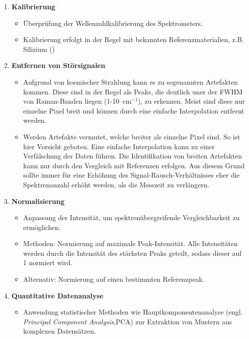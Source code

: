 \begin{enumerate}
    \item \textbf{Kalibrierung}
    \begin{itemize}
        \item Überprüfung der Wellenzahlkalibrierung des Spektrometers.
        \item Kalibrierung erfolgt in der Regel mit bekannten Referenzmaterialien, z.B. Silizium ()
    \end{itemize}
    \item \textbf{Entfernen von Störsignalen}
        \begin{itemize}
        \item Aufgrund von kosmischer Strahlung kann es zu sogenannten Artefakten kommen. Diese sind in der Regel als 
        Peaks, die deutlich uner der FWHM von Raman-Banden liegen (1-10~cm$^{-1}$), zu erkennen. Meist sind diese nur
         einzelne Pixel breit und können durch eine einfache Interpolation entfernt werden.
        \item Werden Artefakte vermutet, welche breiter als einzelne Pixel sind. So ist hier Vorsicht geboten. Eine einfache Interpolation
        kann zu einer Verfälschung der Daten führen. Die Identifikation von breiten Artefakten kann nur durch den Vergleich 
        mit Referenzen erfolgen. Aus diesem Grund sollte immer für eine Erhöhung des Signal-Rausch-Verhältnisses eher die Spektrenanzahl 
        erhöht werden, als die Messzeit zu verlängern.
    \end{itemize}
    \item \textbf{Normalisierung}
    \begin{itemize}
        \item Anpassung der Intensität, um spektrenübergreifende Vergleichbarkeit zu ermöglichen.
        \item Methoden: Normierung auf maximale Peak-Intensität. Alle Intensitäten werden durch die Intensität des stärksten Peaks geteilt, sodass dieser auf 1 normiert wird.
        \item Alternativ: Normierung auf einen bestimmten Referenzpeak.
    \end{itemize}
    \item \textbf{Quantitative Datenanalyse}
    \begin{itemize}
        \item Anwendung statistischer Methoden wie Hauptkomponentenanalyse (engl. \textit{Principal Component Analysis},PCA) zur Extraktion von Mustern aus komplexen Datensätzen.

\end{itemize}
\end{enumerate}
